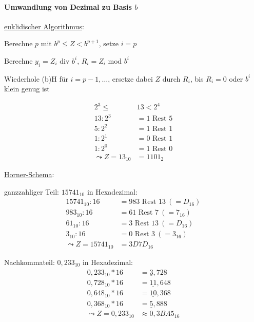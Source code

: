 \paragraph{Umwandlung von Dezimal zu Basis $b$}
\begin{enumeration}
	\item \underline{euklidischer Algorithmus}:
	\begin{enumeration}
		\item Berechne $p$ mit $b^p \leq Z < b^{p+1}$, setze $i=p$
		\item Berechne $y_i=Z_i \text{ div } b^i$, $R_i = Z_i \text{ mod } b^i$
		\item Wiederhole (b)H für $i = p - 1, \dots $, ersetze dabei $Z$ durch $R_i$, bis $R_i=0$ oder $b^i$ klein genug ist
	\end{enumeration}
	\begin{align*}
		2^3 \leq \ &13 < 2^4 \\
		13:2^3 &= 1 \text{ Rest } 5 \\
		5:2^2 &= 1 \text{ Rest } 1 \\
		1:2^1 &= 0 \text{ Rest } 1 \\
		1:2^0 &= 1 \text{ Rest } 0 \\
		\leadsto Z=13_{10} &= 1101_2
	\end{align*}

	\item \underline{Horner-Schema}:
	\begin{enumeration}
	 	\item ganzzahliger Teil: $15741_{10}$ in Hexadezimal:
			\begin{align*}
				15741_{10}:16 &= 983 \text{ Rest } 13 \ (=D_{16}) \\
				983_{10}:16 &= 61 \text{ Rest } 7 \ (=7_{16}) \\
				61_{10}:16 &= 3 \text{ Rest } 13 \ (=D_{16}) \\
				3_{10}:16 &= 0 \text{ Rest } 3 \ (=3_{16}) \\
				\leadsto Z=15741_{10} &= 3D7D_{16}
			\end{align*}
		\item Nachkommateil: $0,233_{10}$ in Hexadezimal:
			\begin{align*}
				0,233_{10}*16 &= \underline{3},728 \\
				0,728_{10}*16 &= \underline{11},648 \\
				0,648_{10}*16 &= \underline{10},368 \\
				0,368_{10}*16 &= \underline{5},888 \\
				\leadsto Z=0,233_{10} &\approx 0,3BA5_{16}
			\end{align*}
	 \end{enumeration} 
\end{enumeration}

